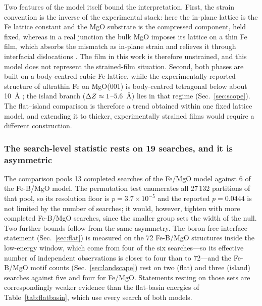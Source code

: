 Two features of the model itself bound the interpretation. First, the strain convention is
the inverse of the experimental stack: here the in-plane lattice is the Fe lattice constant and the
MgO substrate is the compressed component, held fixed, whereas in a real junction the bulk
MgO imposes its lattice on a thin Fe film, which absorbs the mismatch as in-plane strain and relieves
it through interfacial dislocations \cite{yuasa2004}. The film in this work is therefore unstrained,
and this model does not represent the strained-film situation. Second, both phases are built on a
body-centred-cubic Fe lattice, while the experimentally reported structure of ultrathin Fe on
MgO(001) is body-centred tetragonal below about 10~\AA{} \cite{urano1988}; the island branch
($\Delta Z \approx 1$--$5.6$~\AA) lies in that regime (Sec.~\ref{sec:scope}). The flat--island comparison
is therefore a trend obtained within one fixed lattice model, and extending it to thicker,
experimentally strained films would require a different construction.

\subsubsection{The search-level statistic rests on 19 searches, and it is asymmetric} The comparison pools
13 completed searches of the Fe/MgO model against 6 of the Fe-B/MgO model. The permutation test
enumerates all 27\,132 partitions of that pool, so its resolution floor is $p = 3.7\times10^{-5}$ and
the reported $p = 0.0444$ is not limited by the number of searches; it would, however, tighten with
more completed Fe-B/MgO searches, since the smaller group sets the width of the null. Two further
bounds follow from the same asymmetry. The boron-free interface statement (Sec.~\ref{sec:flat}) is
measured on the 72 Fe-B/MgO structures inside the low-energy window, which come from four of
the six searches---so its effective number of independent observations is closer to four than to
72---and the Fe-B/MgO motif counts (Sec.~\ref{sec:landscape}) rest on two (flat) and three (island)
searches against five and four for Fe/MgO. Statements resting on those sets are correspondingly
weaker evidence than the flat-basin energies of Table~\ref{tab:flatbasin}, which use every search of
both models.
